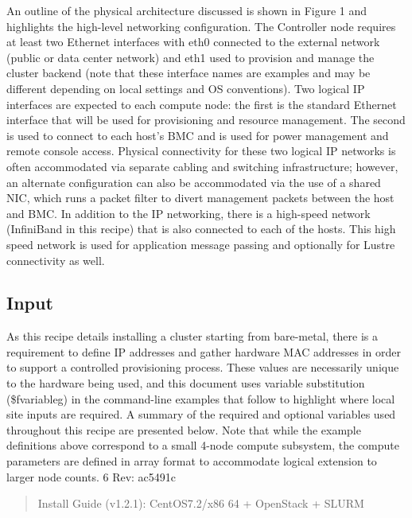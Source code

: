 \begin{section}
{An outline of the physical architecture discussed is shown in Figure 1 and highlights the high-level
networking configuration. The Controller node requires at least two Ethernet interfaces with eth0 connected to
the external network (public or data center network) and eth1 used to provision and manage the cluster backend (note that these interface names are examples and may be different depending on local settings and OS conventions). Two logical IP interfaces are expected to each compute node: the first is the standard Ethernet interface that
will be used for provisioning and resource management. The second is used to connect to each host’s BMC
and is used for power management and remote console access. Physical connectivity for these two logical
IP networks is often accommodated via separate cabling and switching infrastructure; however, an alternate
configuration can also be accommodated via the use of a shared NIC, which runs a packet filter to divert
management packets between the host and BMC.
In addition to the IP networking, there is a high-speed network (InfiniBand in this recipe) that is also
connected to each of the hosts. This high speed network is used for application message passing and optionally
for Lustre connectivity as well.

\subsection*{Input}
As this recipe details installing a cluster starting from bare-metal, there is a requirement to define IP addresses and gather hardware MAC addresses in order to support a controlled provisioning process. These
values are necessarily unique to the hardware being used, and this document uses variable substitution 
(\$fvariableg) in the command-line examples that follow to highlight where local site inputs are required.
A summary of the required and optional variables used throughout this recipe are presented below. Note
that while the example definitions above correspond to a small 4-node compute subsystem, the compute
parameters are defined in array format to accommodate logical extension to larger node counts.
6 Rev: ac5491c
\begin{quote}\small{Install Guide (v1.2.1): CentOS7.2/x86 64 + OpenStack + SLURM}
\end{quote}

%
}
\end{section}